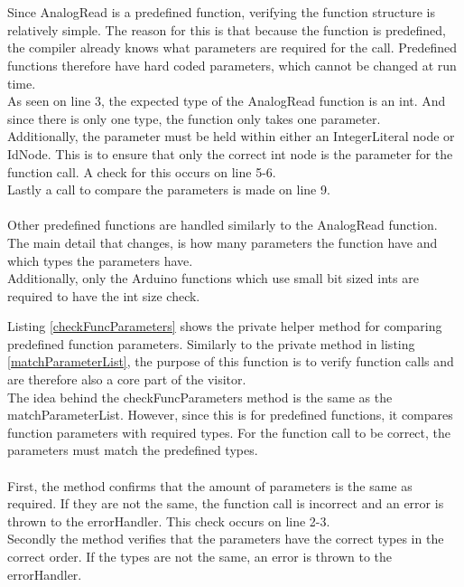 \\\\
Since AnalogRead is a predefined function, verifying the function structure is relatively simple. The reason for this is that because the function is predefined, the compiler already knows what parameters are required for the call. Predefined functions therefore have hard coded parameters, which cannot be changed at run time.\\
As seen on line 3, the expected type of the AnalogRead function is an int. And since there is only one type, the function only takes one parameter.\\
Additionally, the parameter must be held within either an IntegerLiteral node or IdNode. This is to ensure that only the correct int node is the parameter for the function call. A check for this occurs on line 5-6.\\
Lastly a call to compare the parameters is made on line 9.
\\\\
Other predefined functions are handled similarly to the AnalogRead function. The main detail that changes, is how many parameters the function have and which types the parameters have.\\
Additionally, only the Arduino functions which use small bit sized ints are required to have the int size check.

\noindent\newline
Listing \ref{checkFuncParameters} shows the private helper method for comparing predefined function parameters. Similarly to the private method in listing \ref{matchParameterList}, the purpose of this function is to verify function calls and are therefore also a core part of the visitor.\\
The idea behind the checkFuncParameters method is the same as the matchParameterList. However, since this is for predefined functions, it compares function parameters with required types. For the function call to be correct, the parameters must match the predefined types.
\\\\
First, the method confirms that the amount of parameters is the same as required. If they are not the same, the function call is incorrect and an error is thrown to the errorHandler. This check occurs on line 2-3.\\
Secondly the method verifies that the parameters have the correct types in the correct order. If the types are not the same, an error is thrown to the errorHandler.\\

